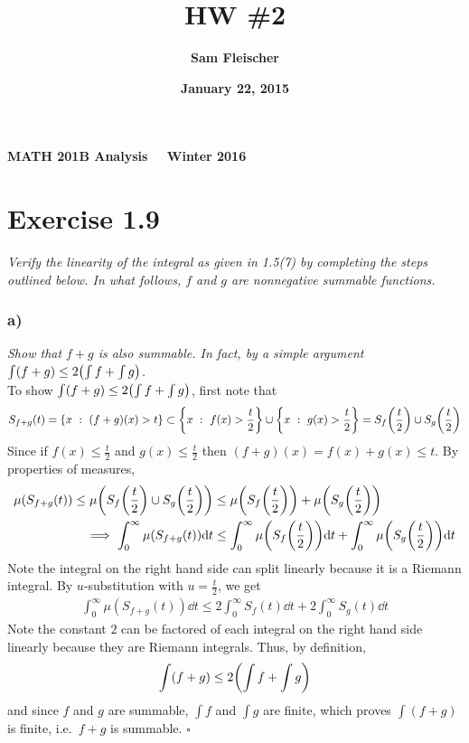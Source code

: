 \documentclass[12pt]{article}
\title{\bf HW \#2}
\author{\bf Sam Fleischer}
\date{\bf January 22, 2015}
\theoremstyle{plain}
\begin{document}
\textbf{MATH 201B \hfill Analysis \ \ \hfill Winter 2016\ \ \ }

{\let\newpage\relax\maketitle}

\section*{Exercise 1.9}
\textit{Verify the linearity of the integral as given in 1.5(7) by completing the steps outlined below.  In what follows, $f$ and $g$ are nonnegative summable functions.}

\subsubsection*{ a)}
\textit{Show that $f + g$ is also summable.  In fact, by a simple argument $\int(f + g) \leq 2\qty(\int f + \int g)$.} \\

To show $\int (f + g) \leq 2\qty(\int f + \int g)$, first note that
\begin{align*}
    S_{f + g}(t) = \{x\ :\ (f+g)(x) > t\} \subset \left\{x\ :\ f(x) > \frac{t}{2}\right\} \cup \left\{x\ :\ g(x) > \frac{t}{2}\right\} = S_f\qty(\frac{t}{2}) \cup S_g\qty(\frac{t}{2})
\end{align*}
Since if $f(x) \leq \frac{t}{2}$ and $g(x) \leq \frac{t}{2}$ then $(f + g)(x) = f(x) + g(x) \leq t$.  By properties of measures, 
\begin{align*}
    \mu(S_{f + g}(t)) \leq \mu\qty(S_f\qty(\frac{t}{2}) \cup S_g\qty(\frac{t}{2})) &\leq \mu\qty(S_f\qty(\frac{t}{2})) + \mu\qty(S_g\qty(\frac{t}{2})) \\
    \implies \int_0^\infty \mu(S_{f + g}(t)) \dd t &\leq \int_0^\infty \mu\qty(S_f\qty(\frac{t}{2}))\dd t + \int_0^\infty \mu\qty(S_g\qty(\frac{t}{2}))\dd t
\end{align*}
Note the integral on the right hand side can split linearly because it is a Riemann integral.  By $u$-substitution with $u = \frac{t}{2}$, we get
\begin{align*}
    \int_0^\infty \mu(S_{f + g}(t))\dd t \leq 2\int_0^\infty S_f(t)\dd t + 2\int_0^\infty S_g(t)\dd t
\end{align*}
Note the constant $2$ can be factored of each integral on the right hand side linearly because they are Riemann integrals.  Thus, by definition,
\begin{align*}
    \int (f + g) \leq 2\qty(\int f + \int g)
\end{align*}
and since $f$ and $g$ are summable, $\int f$ and $\int g$ are finite, which proves $\int (f + g)$ is finite, i.e.~$f + g$ is summable. \hfill $\square$
\end{document}
